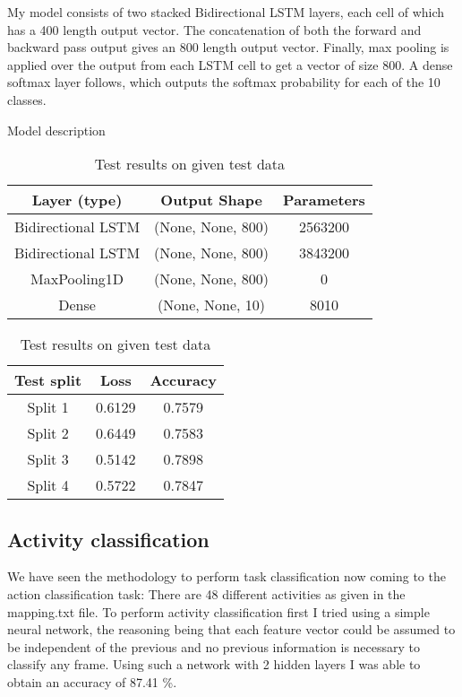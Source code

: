 \documentclass{article}
\begin{document}
My model consists of two stacked Bidirectional LSTM layers, each cell of which has a 400 length output vector. The concatenation of both the forward and backward pass output gives an 800 length output vector. Finally, max pooling is applied over the output from each LSTM cell to get a vector of size 800. A dense softmax layer follows, which outputs the softmax probability for each of the 10 classes.
\begin{table}[!htb]
    
    \begin{minipage}{.5\linewidth}
      \caption{Model description}
      \centering
        \begin{tabular}{| c | c | c |}
        \hline
        Layer (type) &  Output Shape & Parameters \\
        \hline
        \hline
        Bidirectional LSTM &  (None, None, 800) & 2563200  \\
        Bidirectional LSTM &  (None, None, 800) & 3843200  \\
        MaxPooling1D & (None, None, 800) &  0   \\
        Dense & (None, None, 10) & 8010 \\
        \hline
        \end{tabular}
    \end{minipage}%
    \begin{minipage}{.5\linewidth}
      \centering
        \caption{Test results on given test data}
         \begin{tabular}{| c | c | c |}
            \hline
         Test split & Loss & Accuracy \\ 
         \hline
         Split 1 & 0.6129 & 0.7579 \\  
         Split 2 & 0.6449 & 0.7583  \\
         Split 3 & 0.5142 & 0.7898  \\
         Split 4 & 0.5722 & 0.7847  \\
         \hline
         
        \end{tabular}
    \end{minipage} 
\end{table}
\subsection*{Activity classification}
We have seen the methodology to perform task classification now coming to the action classification task:
There are 48 different activities as given in the mapping.txt file.
To perform activity classification first I tried using a simple neural network, the reasoning being that each feature vector could be assumed to be independent of the previous and no previous information is necessary to classify any frame. Using such a network with 2 hidden layers I was able to obtain an accuracy of 87.41 \%.
\end{document}

